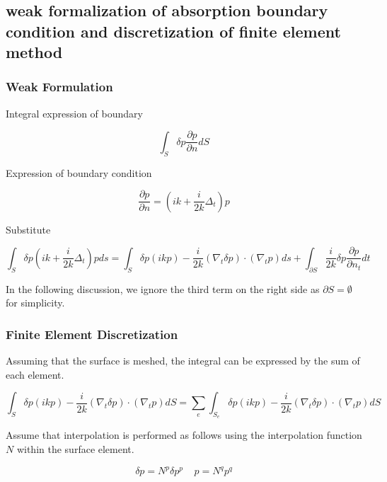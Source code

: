 \subsection{weak formalization of absorption boundary condition and discretization of finite element method}

\subsubsection{Weak Formulation}

Integral expression of boundary

\begin{equation}
\int_S \delta p \frac{\partial p}{\partial n} dS
\end{equation}

Expression of boundary condition

\begin{equation}
\frac{\partial p}{\partial n} = \left(ik+\frac{i}{2k}\Delta_t\right)p
\end{equation}

Substitute

\begin{equation}
\int_S \delta p \left(ik+\frac{i}{2k}\Delta_t\right)p ds = \int_S \delta p (ik p)-\frac{i}{2k}(\nabla_t\delta p)\cdot(\nabla_t p) ds +  \int_{\partial S}\frac{i}{2k}\delta p \frac{\partial p}{\partial n_t} dt
\end{equation}

In the following discussion, we ignore the third term on the right side as $\partial S = \emptyset$ for simplicity.


\subsubsection{Finite Element Discretization}
Assuming that the surface is meshed, the integral can be expressed by the sum of each element.

\begin{equation}
\int_S \delta p (ik p)-\frac{i}{2k}(\nabla_t\delta p)\cdot(\nabla_t p) dS = \sum_e \int_{S_e} \delta p (ik p)-\frac{i}{2k}(\nabla_t\delta p)\cdot(\nabla_t p) dS
\end{equation}

Assume that interpolation is performed as follows using the interpolation function $N$ within the surface element.

\begin{equation}
\delta p = N^p \delta p^p\;\;\;\; p = N^q p^q
\end{equation}

